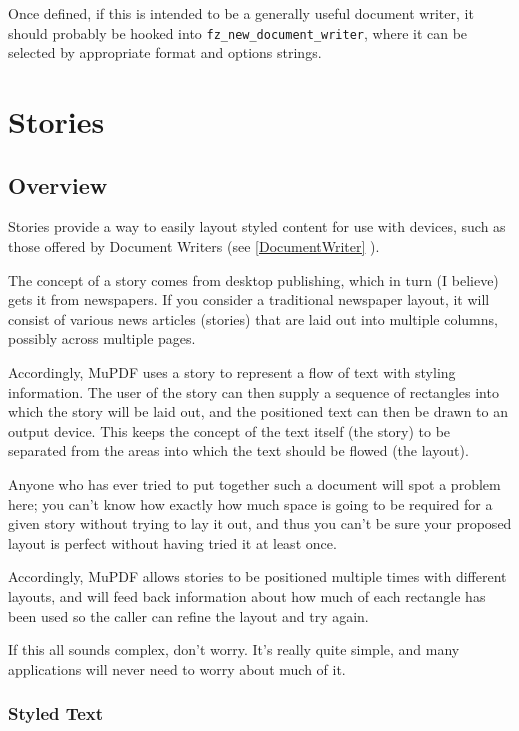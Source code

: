 \documentclass[oneside]{book}
\newcommand{\rjwref}[1] {\autoref{#1} \nameref{#1}}
\begin{document}
Once defined, if this is intended to be a generally useful document writer, it should probably be hooked into \texttt{fz\_new\_document\_writer}, where it can be selected by appropriate format and options strings.

\chapter{Stories}
\label{Story}

\section{Overview}

Stories provide a way to easily layout styled content for use with devices, such as those offered by Document Writers (see \rjwref{DocumentWriter}).

The concept of a story comes from desktop publishing, which in turn (I believe) gets it from newspapers. If you consider a traditional newspaper layout, it will consist of various news articles (stories) that are laid out into multiple columns, possibly across multiple pages.

Accordingly, MuPDF uses a story to represent a flow of text with styling information. The user of the story can then supply a sequence of rectangles into which the story will be laid out, and the positioned text can then be drawn to an output device. This keeps the concept of the text itself (the story) to be separated from the areas into which the text should be flowed (the layout).

Anyone who has ever tried to put together such a document will spot a problem here; you can't know how exactly how much space is going to be required for a given story without trying to lay it out, and thus you can't be sure your proposed layout is perfect without having tried it at least once.

Accordingly, MuPDF allows stories to be positioned multiple times with different layouts, and will feed back information about how much of each rectangle has been used so the caller can refine the layout and try again.

If this all sounds complex, don't worry. It's really quite simple, and many applications will never need to worry about much of it.

\subsection{Styled Text}
\end{document}
